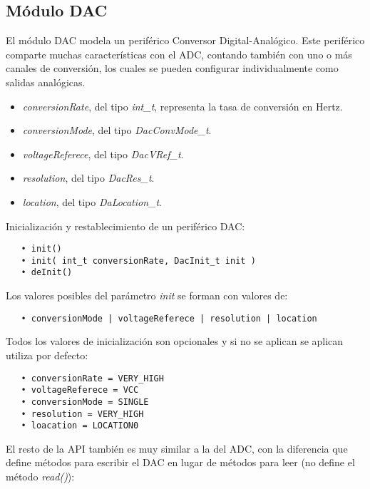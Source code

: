 \subsection{Módulo DAC}

El módulo DAC modela un periférico Conversor Digital-Analógico. Este periférico comparte muchas características con el ADC, contando también con uno o más canales de conversión, los cuales se pueden configurar individualmente como salidas analógicas.


\begin{itemize}
\item
\emph{conversionRate}, del tipo \emph{int\_t}, representa la tasa de conversión en Hertz.
\item
\emph{conversionMode}, del tipo \emph{DacConvMode\_t}.
\item
\emph{voltageReferece}, del tipo \emph{DacVRef\_t}.
\item
\emph{resolution}, del tipo \emph{DacRes\_t}.
\item
\emph{location}, del tipo \emph{DaLocation\_t}.
\end{itemize}

\pagebreak


Inicialización y restablecimiento de un periférico DAC:

\begin{verbatim}
   • init()
   • init( int_t conversionRate, DacInit_t init )
   • deInit()
\end{verbatim}

Los valores posibles del parámetro \emph{init} se forman con valores de:

\begin{verbatim}
   • conversionMode | voltageReferece | resolution | location
\end{verbatim}

Todos los valores de inicialización son opcionales y si no se aplican se aplican utiliza por defecto:

\begin{verbatim}
   • conversionRate = VERY_HIGH
   • voltageReferece = VCC
   • conversionMode = SINGLE
   • resolution = VERY_HIGH
   • loacation = LOCATION0
\end{verbatim}

El resto de la API también es muy similar a la del ADC, con la diferencia que define métodos para escribir el DAC en lugar de métodos para leer (no define el método \emph{read()}):


